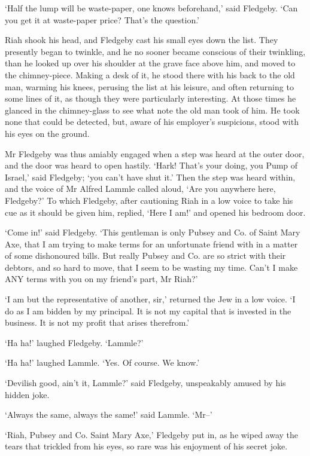‘Half the lump will be waste-paper, one knows beforehand,’ said
Fledgeby. ‘Can you get it at waste-paper price? That’s the question.’

Riah shook his head, and Fledgeby cast his small eyes down the list.
They presently began to twinkle, and he no sooner became conscious of
their twinkling, than he looked up over his shoulder at the grave face
above him, and moved to the chimney-piece. Making a desk of it, he stood
there with his back to the old man, warming his knees, perusing the list
at his leisure, and often returning to some lines of it, as though
they were particularly interesting. At those times he glanced in the
chimney-glass to see what note the old man took of him. He took none
that could be detected, but, aware of his employer’s suspicions, stood
with his eyes on the ground.

Mr Fledgeby was thus amiably engaged when a step was heard at the outer
door, and the door was heard to open hastily. ‘Hark! That’s your doing,
you Pump of Israel,’ said Fledgeby; ‘you can’t have shut it.’ Then the
step was heard within, and the voice of Mr Alfred Lammle called aloud,
‘Are you anywhere here, Fledgeby?’ To which Fledgeby, after cautioning
Riah in a low voice to take his cue as it should be given him, replied,
‘Here I am!’ and opened his bedroom door.

‘Come in!’ said Fledgeby. ‘This gentleman is only Pubsey and Co. of
Saint Mary Axe, that I am trying to make terms for an unfortunate friend
with in a matter of some dishonoured bills. But really Pubsey and Co.
are so strict with their debtors, and so hard to move, that I seem to be
wasting my time. Can’t I make ANY terms with you on my friend’s part, Mr
Riah?’

‘I am but the representative of another, sir,’ returned the Jew in a low
voice. ‘I do as I am bidden by my principal. It is not my capital that
is invested in the business. It is not my profit that arises therefrom.’

‘Ha ha!’ laughed Fledgeby. ‘Lammle?’

‘Ha ha!’ laughed Lammle. ‘Yes. Of course. We know.’

‘Devilish good, ain’t it, Lammle?’ said Fledgeby, unspeakably amused by
his hidden joke.

‘Always the same, always the same!’ said Lammle. ‘Mr--’

‘Riah, Pubsey and Co. Saint Mary Axe,’ Fledgeby put in, as he wiped away
the tears that trickled from his eyes, so rare was his enjoyment of his
secret joke.

